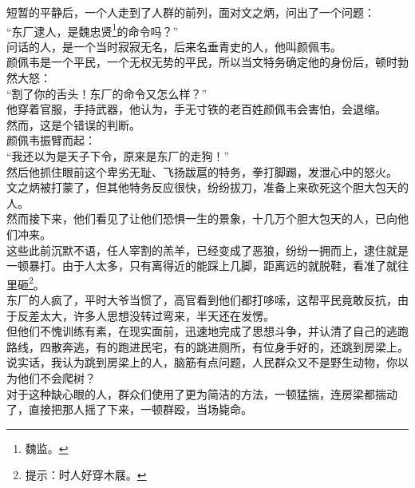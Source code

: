 \begin{multicols}{\theparacolNo}
短暂的平静后，一个人走到了人群的前列，面对文之炳，问出了一个问题：\\

“东厂逮人，是魏忠贤\footnote{魏监。}的命令吗？”\\

问话的人，是一个当时寂寂无名，后来名垂青史的人，他叫颜佩韦。\\

颜佩韦是一个平民，一个无权无势的平民，所以当文特务确定他的身份后，顿时勃然大怒：\\

“割了你的舌头！东厂的命令又怎么样？”\\

他穿着官服，手持武器，他认为，手无寸铁的老百姓颜佩韦会害怕，会退缩。\\

然而，这是个错误的判断。\\

颜佩韦振臂而起：\\

“我还以为是天子下令，原来是东厂的走狗！”\\

然后他抓住眼前这个卑劣无耻、飞扬跋扈的特务，拳打脚踢，发泄心中的怒火。\\

文之炳被打蒙了，但其他特务反应很快，纷纷拔刀，准备上来砍死这个胆大包天的人。\\

然而接下来，他们看见了让他们恐惧一生的景象，十几万个胆大包天的人，已向他们冲来。\\

这些此前沉默不语，任人宰割的羔羊，已经变成了恶狼，纷纷一拥而上，逮住就是一顿暴打。由于人太多，只有离得近的能踩上几脚，距离远的就脱鞋，看准了就往里砸\footnote{提示：时人好穿木屐。}。\\

东厂的人疯了，平时大爷当惯了，高官看到他们都打哆嗦，这帮平民竟敢反抗，由于反差太大，许多人思想没转过弯来，半天还在发愣。\\

但他们不愧训练有素，在现实面前，迅速地完成了思想斗争，并认清了自己的逃跑路线，四散奔逃，有的跑进民宅，有的跳进厕所，有位身手好的，还跳到房梁上。\\

说实话，我认为跳到房梁上的人，脑筋有点问题，人民群众又不是野生动物，你以为他们不会爬树？\\

对于这种缺心眼的人，群众们使用了更为简洁的方法，一顿猛揣，连房梁都揣动了，直接把那人摇了下来，一顿群殴，当场毙命。\\


\end{multicols}

